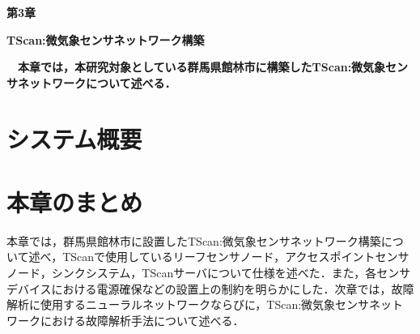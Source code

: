 \newpage
\setcounter{chapter}{3}
\setcounter{section}{0}

\begin{center}
\vspace{0.5cm}
\huge{\bf 第3章}
\par
\vspace{1cm}
\hrulefill
\par
\vspace{1cm}
\huge{\bf TScan:微気象センサネットワーク構築}
\par
\vspace{0.5cm}
\hrulefill
\vspace{1cm}
\par

\begin{flushleft}
\large{{\bf　本章では，本研究対象としている群馬県館林市に構築したTScan:微気象センサネットワークについて述べる．}}
\end{flushleft}
\end{center}


\newpage
\section{システム概要}

\newpage

\section{本章のまとめ}
本章では，群馬県館林市に設置したTScan:微気象センサネットワーク構築について述べ，TScanで使用しているリーフセンサノード，アクセスポイントセンサノード，シンクシステム，TScanサーバについて仕様を述べた．また，各センサデバイスにおける電源確保などの設置上の制約を明らかにした．次章では，故障解析に使用するニューラルネットワークならびに，TScan:微気象センサネットワークにおける故障解析手法について述べる．

\newpage
